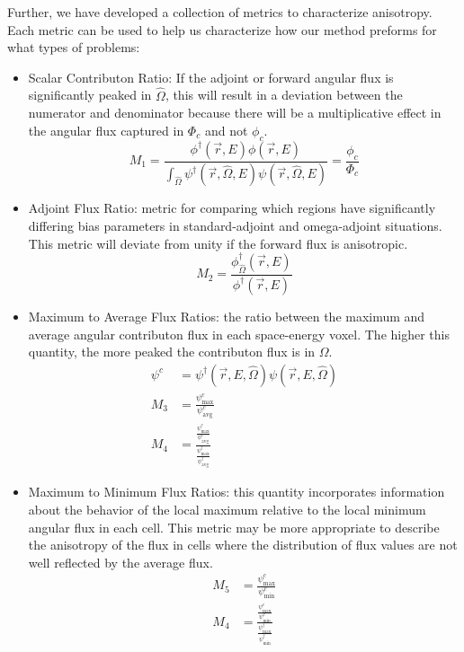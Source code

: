 \documentclass[12pt]{article}
\newcommand{\vOmega}{\ensuremath{\hat{\Omega}}}
\newcommand{\vecr}{\ensuremath{\vec{r}}}
\begin{document}
\begin{enumerate}
Further, we have developed a collection of metrics to characterize anisotropy. 
Each metric can be used to help us characterize how our method preforms for what types of problems:
\vspace*{-.5em}
      \begin{itemize}
      \item Scalar Contributon Ratio: If the adjoint or forward angular flux is significantly peaked in $\vOmega$, this will result in a deviation between the numerator and denominator because there will be a multiplicative effect in the angular flux captured in $\Phi_{c}$ and not $\phi_{c}$.
      \[M_{1} = \frac{\phi^{\dagger}(\vecr,E)\phi(\vecr,E)}{\int_{\vOmega}\psi^{\dagger}(\vecr,\vOmega,E)\psi(\vecr,\vOmega,E)} = \frac{\phi_{c}}{\Phi_{c}}\]
      
      \item Adjoint Flux Ratio: metric for comparing which regions have significantly differing bias parameters in standard-adjoint and omega-adjoint situations. This metric will deviate from unity if the forward flux is anisotropic.
      \[M_{2} = \frac{\phi^{\dagger}_{\vOmega}(\vecr,E)}{\phi^{\dagger}(\vecr,E)}\]
      
      \item Maximum to Average Flux Ratios: the ratio between the maximum and average angular contributon flux in each space-energy voxel. The higher this quantity, the more peaked the contributon flux is in $\Omega$. 
      \begin{align*}
      \psi^{c} &= \psi^{\dagger}(\vecr,E, \vOmega)\psi(\vecr,E, \vOmega)\\
      M_{3} &= \frac{\psi^c_{\max}}{\psi^{c}_{\text{avg}}}\\
      M_{4} &=  \frac{\frac{\psi^{c}_{\max}}{\psi^{c}_{\text{avg}}}}{\frac{\psi^{\dagger}_{\max}}{\psi^{\dagger}_{\text{avg}}}} 
      \end{align*} 
      
       \item Maximum to Minimum Flux Ratios: this quantity incorporates information about the behavior of the local maximum relative to the local minimum angular flux in each cell. This metric may be more appropriate to describe the anisotropy of the flux in cells where the distribution of flux values are not well reflected by the average flux.
       \begin{align*}
      M_{5} &= \frac{\psi^c_{\max}}{\psi^{c}_{\min}}\\
      M_{4} &=  \frac{\frac{\psi^{c}_{\max}}{\psi^{c}_{\min}}}{\frac{\psi^{\dagger}_{\max}}{\psi^{\dagger}_{\min}}}
       \end{align*}
      \end{itemize} 
 

\end{enumerate}
\end{document}
